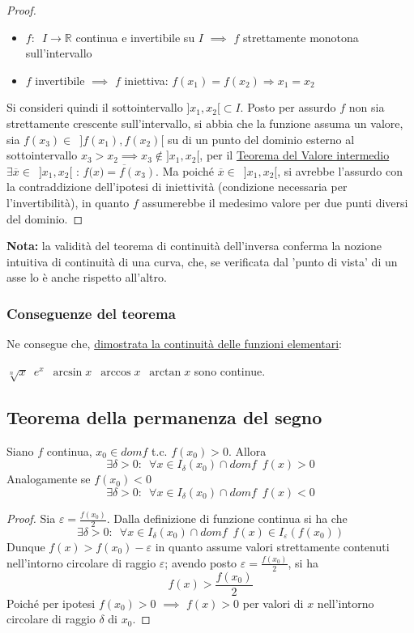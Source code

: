 \documentclass[10pt, oneside]{book}
\theoremstyle{plain}
\begin{document}
\begin{proof}
\begin{itemize}[label=$\cdot$]
    \item  $f: \enspace I \rightarrow \mathbb{R}$ continua e invertibile su $I$ $\implies$ $f$ strettamente monotona sull'intervallo
    \item $f$ invertibile $\implies$ $f$ iniettiva: $f(x_1) = f(x_2) \Rightarrow x_1 = x_2$
\end{itemize} 
Si consideri quindi il sottointervallo $]x_1, x_2[ \subset I$. Posto per assurdo $f$ non sia strettamente crescente sull'intervallo, si abbia che la funzione assuma un valore, sia $f(x_3) \in \enspace ]f(x_1), f(x_2)[$ su di un punto del dominio esterno al sottointervallo $x_3 > x_2 \implies x_3 \notin ]x_1, x_2[$, per il \hyperlink{valint}{Teorema del Valore intermedio} $\exists \overline{x} \in \enspace ]x_1, x_2[$ : $f(\overline{x) = f(x_3)}$. Ma poiché $\overline{x} \in \enspace ]x_1, x_2[$, si avrebbe l'assurdo con la contraddizione dell'ipotesi di iniettività (condizione necessaria per l'invertibilità), in quanto $f$ assumerebbe il medesimo valore per due punti diversi del dominio.
\end{proof}
\textbf{Nota:} la validità del teorema di continuità dell'inversa conferma la nozione intuitiva di continuità di una curva, che, se verificata dal 'punto di vista' di un asse lo è anche rispetto all'altro.

\subsubsection{Conseguenze del teorema}
Ne consegue che, \hyperlink{elementarii}{dimostrata la continuità delle funzioni elementari}:\\ \begin{center}$\sqrt[n]{x} \enspace e^x \enspace \arcsin{x} \enspace \arccos{x} \enspace \arctan{x}$ sono continue.\end{center}

\subsection{Teorema della permanenza del segno}
\label{subsubsec:perman}
\begin{ther}[\textbf{T. p. s.}]
Siano $f$ continua, $x_0 \in dom f$ t.c. $f(x_0) > 0$. Allora
\[\exists \delta > 0 : \enspace \forall x \in I_{\delta}(x_0) \cap dom f \enspace f(x) > 0\]
Analogamente se $f(x_0) < 0$
\[\exists \delta > 0 : \enspace \forall x \in I_{\delta}(x_0) \cap dom f \enspace f(x) < 0\]
\end{ther}
\begin{proof}
Sia $\varepsilon = \frac{f(x_0)}{2}$. Dalla definizione di funzione continua si ha che 
\[\exists \delta > 0 : \enspace \forall x \in I_{\delta}(x_0) \cap dom f \enspace f(x) \in I_{\varepsilon}(f(x_0))\]
Dunque $f(x) > f(x_0) - \varepsilon$ in quanto assume valori strettamente contenuti nell'intorno circolare di raggio $\varepsilon$; avendo posto $\varepsilon = \frac{f(x_0)}{2}$, si ha \[f(x) > \frac{f(x_0)}{2}\] Poiché per ipotesi $f(x_0) > 0$ $\implies$ $f(x) > 0$ per valori di $x$ nell'intorno circolare di raggio $\delta$ di $x_0$.
\end{proof}
\end{document}
